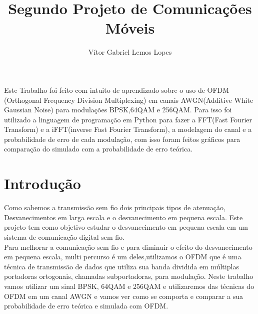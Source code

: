 \documentclass[12pt]{article}
\title{Segundo Projeto de Comunicações Móveis}
\author{Vítor Gabriel Lemos Lopes}
\begin{document}
 

\maketitle

     
\begin{resumo} 
  Este Trabalho foi feito com intuito de aprendizado sobre o uso de OFDM (Orthogonal Frequency Division Multiplexing) em canais AWGN(Additive White Gaussian Noise) para modulações BPSK,64QAM e 256QAM. Para isso foi utilizado a linguagem de programação em Python para fazer a FFT(Fast Fourier Transform) e a iFFT(inverse Fast Fourier Transform), a modelagem do canal e a probabilidade de erro de cada modulação, com isso foram feitos gráficos para comparação do simulado com a probabilidade de erro teórica.
\end{resumo}
\section{Introdução}

Como sabemos a transmissão sem fio dois principais tipos de atenuação, Desvanecimentos em larga escala e o desvanecimento em pequena escala. Este projeto tem como objetivo estudar o desvanecimento em pequena escala em um sistema de comunicação digital sem fio. \\
Para melhorar a comunicação sem fio e para diminuir o efeito do desvanecimento em pequena escala, multi percurso é um deles,utilizamos o OFDM que é uma técnica de  transmissão de dados que utiliza sua banda dividida em múltiplas portadoras ortogonais, chamadas subportadoras, para modulação\cite{Weiss2004SpectrumPA}. Neste trabalho vamos utilizar um sinal BPSK, 64QAM e 256QAM e utilizaremos das técnicas do OFDM em um canal AWGN e vamos ver como se comporta e comparar a sua probabilidade de erro teórica e simulada com OFDM. %
 
\end{document}
